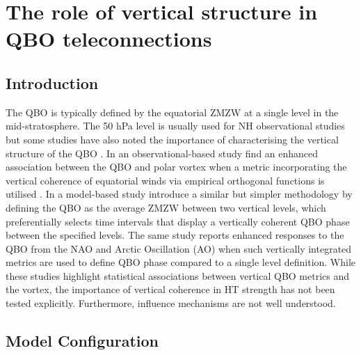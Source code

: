 \chapter{The role of vertical structure in QBO teleconnections}
\label{cha:deepQBO}

\section{Introduction}
\label{sec:deepQBO-introduction}
The QBO is typically defined by the equatorial ZMZW at a single level in the mid-stratosphere. The 50 hPa level is usually used for NH observational studies \citep{Baldwin2001, Baldwin98} but some studies have also noted the importance of characterising the vertical structure of the QBO \citep{Fraedrih1993, Wallace1993,  Baldwin98,  Dunkerton2017, graySurface2018, andrewsObserved2019}. In an observational-based study \cite{graySurface2018} find an enhanced association between the QBO and polar vortex when a metric incorporating the vertical coherence of equatorial winds via empirical orthogonal functions is utilised \citep{verena2016a}. In a model-based study \cite{andrewsObserved2019} introduce a similar but simpler methodology by defining the QBO as the average ZMZW between two vertical levels, which preferentially selects time intervals that display a vertically coherent QBO phase between the specified levels. The same study reports enhanced responses to the QBO from the NAO and Arctic Oscillation (AO) when such vertically integrated metrics are used to define QBO phase compared to a single level definition. While these studies highlight statistical associations between vertical QBO metrics and the vortex, the importance of vertical coherence in HT strength has not been tested explicitly. Furthermore, influence mechanisms are not well understood. 


\section{Model Configuration}

